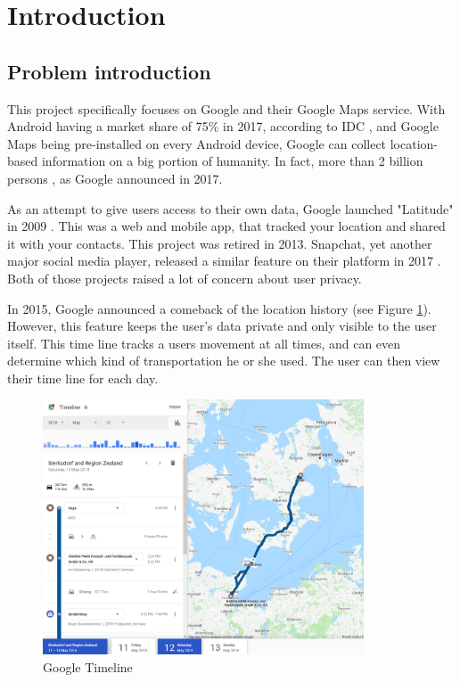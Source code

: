 \documentclass[12p]{article}
\begin{document}

\section{Introduction}

\subsection{Problem introduction} \label{ProblemIntroduction}

This project specifically focuses on Google and their Google Maps service. With Android having a market share of 75\% in 2017, according to IDC \cite{SmartphoneOSMarketShare}, and Google Maps being pre-installed on every Android device, Google can collect location-based information on a big portion of humanity. In fact, more than 2 billion persons \cite{AndroidMonthlyActiveUsers}, as Google announced in 2017.

As an attempt to give users access to their own data, Google launched "Latitude" in 2009 \cite{GoogleLatitude}. This was a web and mobile app, that tracked your location and shared it with your contacts. This project was retired in 2013. Snapchat, yet another major social media player, released a similar feature on their platform in 2017 \cite{SnapchatMap}. Both of those projects raised a lot of concern about user privacy.

In 2015, Google announced a comeback of the location history \cite{TimelineAnnouncement} (see Figure \ref{fig:timeline}). However, this feature keeps the user's data private and only visible to the user itself. This time line tracks a users movement at all times, and can even determine which kind of transportation he or she used. The user can then view their time line for each day.

\begin{figure}[ht]
    \center
    \includegraphics[width=0.85\textwidth]{timeline}
    \caption{Google Timeline}
    \label{fig:timeline}
\end{figure}
\end{document}
